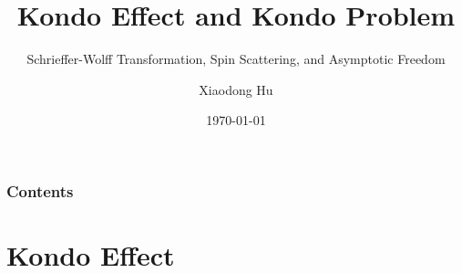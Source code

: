 \documentclass[10pt,aspectratio=43,xcolor=x11names]{beamer}%
\begin{document}
\title[Kondo Effect and Kondo Problem]{Kondo Effect and Kondo Problem}
\subtitle{Schrieffer-Wolff Transformation, Spin Scattering, and Asymptotic Freedom}
\author[Xiaodong Hu]{Xiaodong Hu}
\date{\today}

\begin{frame}[plain] %
	\titlepage
\end{frame}



\begin{frame}
	\frametitle{Contents}
	\tableofcontents
\end{frame}


\section{Kondo Effect}
\end{document}
